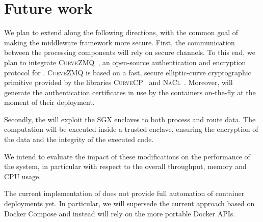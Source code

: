\section{Future work}\label{sec:future}
We plan to extend \SYS{} along the following directions, with the common goal of making the middleware framework more secure.
First, the communication between the processing components will rely on secure channels.
To this end, we plan to integrate \textsc{CurveZMQ}~\cite{zmq:curvezmq}, an open-source authentication and encryption protocol for \zmq{}.
\textsc{CurveZMQ} is based on a fast, secure elliptic-curve cryptographic primitive provided by the libraries \textsc{CurveCP}~\cite{zmq:curvecp} and \textsc{NaCl}~\cite{zmq:nacl}. 
Moreover, \SYS{} will generate the authentication certificates in use by the containers on-the-fly at the moment of their deployment.

Secondly, the \SYS{} will exploit the SGX enclaves to both process and route data.
The computation will be executed inside a trusted enclave, ensuring the encryption of the data and the integrity of the executed code.

We intend to evaluate the impact of these modifications on the performance of the system, in particular with respect to the overall throughput, memory and CPU usage.

The current implementation of \SYS does not provide full automation of container deployments yet.
In particular, we will supersede the current approach based on Docker Compose and instead will rely on the more portable Docker APIs.


